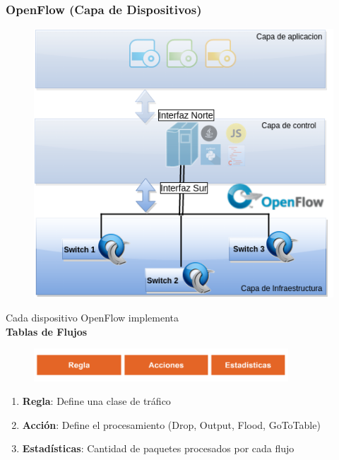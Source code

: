 \documentclass{beamer}
\begin{document}
\begin{frame}
\frametitle{OpenFlow (Capa de Dispositivos)} 
\begin{minipage}{0.40\textwidth}
	\begin{figure}[H]
		\centering
		\includegraphics[width=1.0\textwidth]{imagenes/openflowDevices.png}
	\end{figure}

\end{minipage}
\hfill
\begin{minipage}{0.58\textwidth}

Cada dispositivo OpenFlow implementa \\ \textbf{Tablas de Flujos}

	\begin{figure}[H]
		\centering
		\includegraphics[width=0.85\textwidth]{imagenes/OpenFlow.png}
	\end{figure}
 
\begin{enumerate}
\item \textbf{Regla}: Define una clase de tr\'afico
\item \textbf{Acci\'on}: Define el procesamiento (Drop, Output, Flood, GoToTable)
\item \textbf{Estad\'isticas}: Cantidad de paquetes procesados por cada flujo
\end{enumerate}
\end{minipage}

\end{frame}
\end{document}
